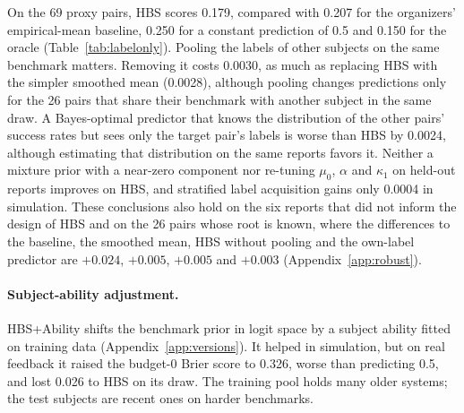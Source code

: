 \documentclass{article}
\begin{document}
On the 69 proxy pairs, HBS scores 0.179, compared with 0.207 for the organizers' empirical-mean baseline, 0.250 for a constant prediction of 0.5 and 0.150 for the oracle (Table~\ref{tab:labelonly}). Pooling the labels of other subjects on the same benchmark matters. Removing it costs 0.0030, as much as replacing HBS with the simpler smoothed mean (0.0028), although pooling changes predictions only for the 26 pairs that share their benchmark with another subject in the same draw. A Bayes-optimal predictor that knows the distribution of the other pairs' success rates but sees only the target pair's labels is worse than HBS by 0.0024, although estimating that distribution on the same reports favors it. Neither a mixture prior with a near-zero component nor re-tuning $\mu_0$, $\alpha$ and $\kappa_1$ on held-out reports improves on HBS, and stratified label acquisition gains only 0.0004 in simulation. These conclusions also hold on the six reports that did not inform the design of HBS and on the 26 pairs whose root is known, where the differences to the baseline, the smoothed mean, HBS without pooling and the own-label predictor are $+0.024$, $+0.005$, $+0.005$ and $+0.003$ (Appendix~\ref{app:robust}).

\paragraph{Subject-ability adjustment.} HBS+Ability shifts the benchmark prior in logit space by a subject ability fitted on training data (Appendix~\ref{app:versions}). It helped in simulation, but on real feedback it raised the budget-0 Brier score to 0.326, worse than predicting 0.5, and lost 0.026 to HBS on its draw. The training pool holds many older systems; the test subjects are recent ones on harder benchmarks.
\end{document}
